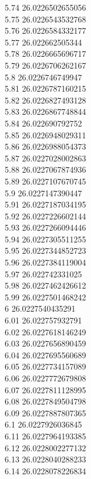{5.74	26.0226502655056\\
5.75	26.0226543532768\\
5.76	26.0226584332177\\
5.77	26.022662505344\\
5.78	26.0226665696717\\
5.79	26.0226706262167\\
5.8	26.0226746749947\\
5.81	26.0226787160215\\
5.82	26.0226827493128\\
5.83	26.0226867748844\\
5.84	26.022690792752\\
5.85	26.0226948029311\\
5.86	26.0226988054373\\
5.87	26.0227028002863\\
5.88	26.0227067874936\\
5.89	26.0227107670745\\
5.9	26.0227147390447\\
5.91	26.0227187034195\\
5.92	26.0227226602144\\
5.93	26.0227266094446\\
5.94	26.0227305511255\\
5.95	26.0227344852723\\
5.96	26.0227384119004\\
5.97	26.022742331025\\
5.98	26.0227462426612\\
5.99	26.0227501468242\\
6	26.0227540435291\\
6.01	26.022757932791\\
6.02	26.0227618146249\\
6.03	26.0227656890459\\
6.04	26.0227695560689\\
6.05	26.0227734157089\\
6.06	26.0227772679808\\
6.07	26.0227811128995\\
6.08	26.0227849504798\\
6.09	26.0227887807365\\
6.1	26.0227926036845\\
6.11	26.0227964193385\\
6.12	26.0228002277132\\
6.13	26.0228040288233\\
6.14	26.0228078226834\\
}
